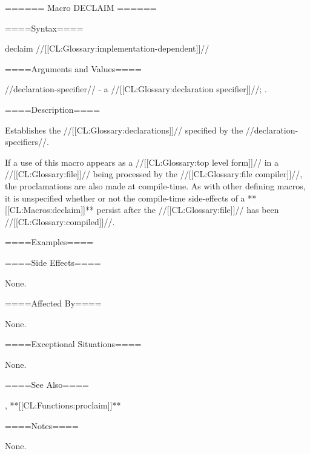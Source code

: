 ====== Macro DECLAIM ======

====Syntax====

\DefmacWithValues declaim {} {//[[CL:Glossary:implementation-dependent]]//}

====Arguments and Values====

//declaration-specifier// - a //[[CL:Glossary:declaration specifier]]//; \noeval.

====Description====

Establishes the //[[CL:Glossary:declarations]]// specified by the //declaration-specifiers//.

If a use of this macro appears as a //[[CL:Glossary:top level form]]// in a //[[CL:Glossary:file]]// being processed by the //[[CL:Glossary:file compiler]]//, the proclamations are also made at compile-time. As with other defining macros, it is unspecified whether or not the compile-time side-effects of a **[[CL:Macros:declaim]]** persist after the //[[CL:Glossary:file]]// has been //[[CL:Glossary:compiled]]//.

====Examples====

====Side Effects====

None.

====Affected By====

None.

====Exceptional Situations====

None.

====See Also====

, **[[CL:Functions:proclaim]]**

====Notes====

None.

